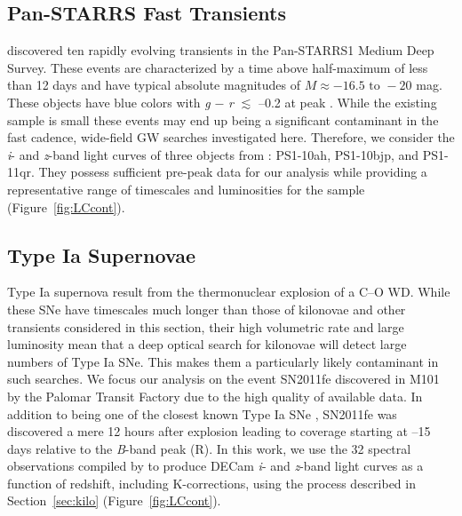 \subsection{Pan-STARRS Fast Transients}
\label{sec:PSFast}
\citet{Drout+14} discovered ten rapidly evolving transients in the Pan-STARRS1 Medium Deep Survey. These events are characterized by a time above half-maximum of less than 12 days and have typical absolute magnitudes of $M \approx -16.5 \text{ to } -20$ mag. These objects have blue colors with {\em g} $-$ {\em r} $\lesssim$ --0.2 at peak \citep{Drout+14}. While the existing sample is small these events may end up being a significant contaminant in the fast cadence, wide-field GW searches investigated here. Therefore, we consider the {\em i}- and {\em z}-band light curves of three objects from \citet{Drout+14}: PS1-10ah, PS1-10bjp, and PS1-11qr. They possess sufficient pre-peak data for our analysis while providing a representative range of timescales and luminosities for the sample (Figure~\ref{fig:LCcont}).
   
\subsection{Type Ia Supernovae}
\label{sec:typeIa}
Type Ia supernova result from the thermonuclear explosion of a C--O WD. While these SNe have timescales much longer than those of kilonovae and other transients considered in this section, their high volumetric rate and large luminosity mean that a deep optical search for kilonovae will detect large numbers of Type Ia SNe. This makes them a particularly likely contaminant in such searches. We focus our analysis on the event SN2011fe discovered in M101 by the Palomar Transit Factory \citep{Nugent+11a} due to the high quality of available data. In addition to being one of the closest known Type Ia SNe \citep[$\mu = 29.04\pm0.19$,][]{ShappeeStanek11}, SN2011fe was discovered a mere 12 hours after explosion \citep{Nugent+11b} leading to coverage starting at --15 days relative to the {\em B}-band peak (R). In this work, we use the 32 spectral observations compiled by \citet{Pereira+13} to produce DECam {\em i}- and {\em z}-band light curves as a function of redshift, including K-corrections, using the process described in Section~\ref{sec:kilo} (Figure~\ref{fig:LCcont}).

